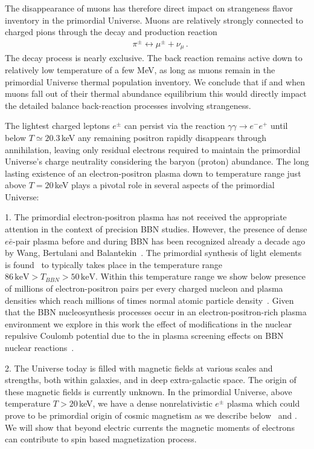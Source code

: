 The disappearance of muons has therefore direct impact on strangeness flavor inventory in the primordial Universe. Muons are relatively strongly connected to charged pions through the decay and production reaction 
\begin{align}
&\pi^\pm\leftrightarrow \mu^\pm+\nu_\mu\,.
\end{align}
The decay process is nearly exclusive. The back reaction remains active down to relatively low temperature of a few MeV, as long as muons remain in the primordial Universe thermal population inventory. We conclude that if and when muons fall out of their thermal abundance equilibrium this would directly impact the detailed balance back-reaction processes involving strangeness. 

The lightest charged leptons $e^\pm$ can persist via the reaction $\gamma\gamma\to e^-e^+$ until below $T\simeq 20.3$\,keV any remaining positron rapidly disappears through annihilation, leaving only residual electrons required to maintain the primordial Universe's charge neutrality considering the baryon (proton) abundance. The long lasting existence of an electron-positron plasma down to temperature range just above $T=20$\,keV plays a pivotal role in several aspects of the primordial Universe: 

1. The primordial electron-positron plasma has not received the appropriate attention in the context of precision BBN studies. However, the presence of dense $e\bar e$-pair plasma before and during BBN has been recognized already a decade ago by Wang, Bertulani and Balantekin~\cite{Wang:2010px}. The primordial synthesis of light elements is found~\cite{Pitrou:2018cgg} to typically takes place in the temperature range $86\,\mathrm{keV}>T_{BBN}>50\,\mathrm{keV}$. Within this temperature range we show below presence of millions of electron-positron pairs per every charged nucleon and plasma densities which reach millions of times normal atomic particle density~\cite{Yang:2024ret,Grayson:2023flr}. Given that the BBN nucleosynthesis processes occur in an electron-positron-rich plasma environment we explore in this work the effect of modifications in the nuclear repulsive Coulomb potential due to the in plasma screening effects on BBN nuclear reactions~\cite{Grayson:2024okq,Grayson:2024uwg}. 

2. The Universe today is filled with magnetic fields at various scales and strengths, both within galaxies, and in deep extra-galactic space. The origin of these magnetic fields is currently unknown. In the primordial Universe, above temperature $T>20$\,keV, we have a dense nonrelativistic $e^\pm$ plasma which could prove to be primordial origin of cosmic magnetism as we describe below~\cite{Steinmetz:2023ucp,Rafelski:2023emw,Steinmetz:2023nsc} and . We will show that beyond electric currents the magnetic moments of electrons can contribute to spin based magnetization process.

